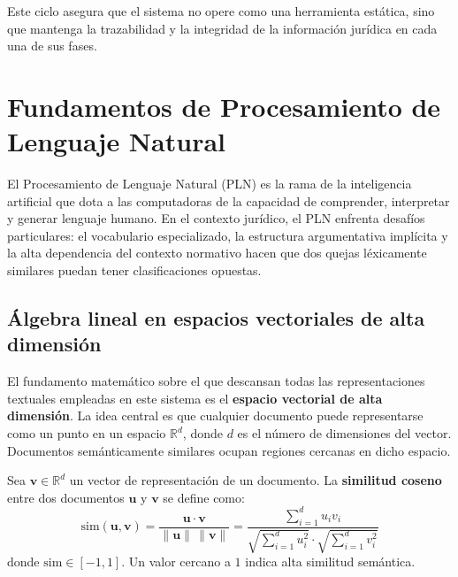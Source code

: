 Este ciclo asegura que el sistema no opere como una herramienta estática, sino
que mantenga la trazabilidad y la integridad de la información jurídica en cada
una de sus fases.

\section{Fundamentos de Procesamiento de Lenguaje Natural}

El Procesamiento de Lenguaje Natural (PLN) es la rama de la inteligencia
artificial que dota a las computadoras de la capacidad de comprender, interpretar
y generar lenguaje humano. En el contexto jurídico, el PLN enfrenta desafíos
particulares: el vocabulario especializado, la estructura argumentativa implícita
y la alta dependencia del contexto normativo hacen que dos quejas léxicamente
similares puedan tener clasificaciones opuestas.

\subsection{Álgebra lineal en espacios vectoriales de alta dimensión}

El fundamento matemático sobre el que descansan todas las representaciones
textuales empleadas en este sistema es el \textbf{espacio vectorial de alta
dimensión}. La idea central es que cualquier documento puede representarse como
un punto en un espacio $\mathbb{R}^d$, donde $d$ es el número de dimensiones
del vector. Documentos semánticamente similares ocupan regiones cercanas en dicho
espacio.


  Sea $\mathbf{v} \in \mathbb{R}^d$ un vector de representación de un documento.
  La \textbf{similitud coseno} entre dos documentos $\mathbf{u}$ y $\mathbf{v}$
  se define como:
  \begin{equation}
    \text{sim}(\mathbf{u}, \mathbf{v})
    = \frac{\mathbf{u} \cdot \mathbf{v}}{\|\mathbf{u}\| \, \|\mathbf{v}\|}
    = \frac{\displaystyle\sum_{i=1}^{d} u_i v_i}
           {\sqrt{\displaystyle\sum_{i=1}^{d} u_i^2}
            \cdot \sqrt{\displaystyle\sum_{i=1}^{d} v_i^2}}
    \label{eq:coseno}
  \end{equation}
  donde $\text{sim} \in [-1, 1]$. Un valor cercano a $1$ indica alta similitud semántica.
  

